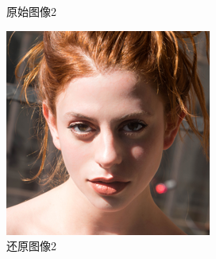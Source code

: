\begin{figure}[H]
\begin{minipage}[b]{0.3\linewidth}
    \caption{原始图像2}
    \label{original image 2}
  \end{minipage}
\hspace{0.1cm}
  \begin{minipage}[b]{0.3\linewidth}
    \includegraphics[width=\linewidth]{Picture/recon/00001.png}
    \caption{还原图像2}
    \label{inpainted image 2}
  \end{minipage}
\end{figure}


